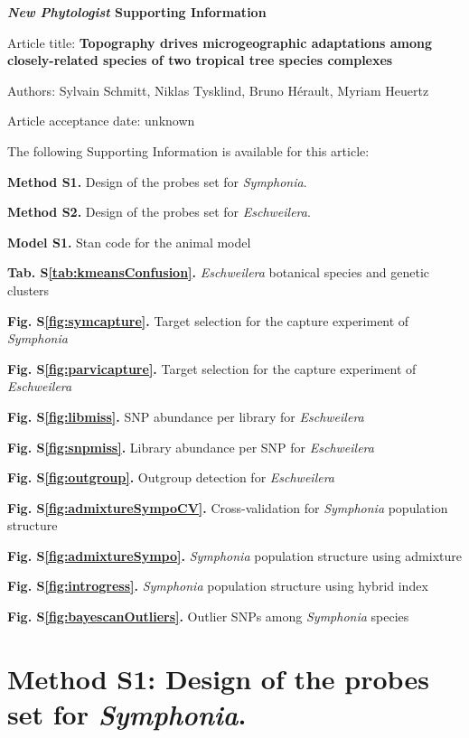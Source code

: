 \documentclass[12pt,]{article}
\begin{document}
\textbf{\emph{New Phytologist} Supporting Information}

Article title: \textbf{Topography drives microgeographic adaptations among closely-related species of two tropical tree species complexes}

Authors: Sylvain Schmitt, Niklas Tysklind, Bruno Hérault, Myriam Heuertz

Article acceptance date: unknown

The following Supporting Information is available for this article:

\textbf{Method S1.} Design of the probes set for \emph{Symphonia}.

\textbf{Method S2.} Design of the probes set for \emph{Eschweilera}.

\textbf{Model S1.} Stan code for the animal model

\textbf{Tab. S\ref{tab:kmeansConfusion}.} \emph{Eschweilera} botanical species and genetic clusters

\textbf{Fig. S\ref{fig:symcapture}.} Target selection for the capture experiment of \emph{Symphonia}

\textbf{Fig. S\ref{fig:parvicapture}.} Target selection for the capture experiment of \emph{Eschweilera}

\textbf{Fig. S\ref{fig:libmiss}.} SNP abundance per library for \emph{Eschweilera}

\textbf{Fig. S\ref{fig:snpmiss}.} Library abundance per SNP for \emph{Eschweilera}

\textbf{Fig. S\ref{fig:outgroup}.} Outgroup detection for \emph{Eschweilera}

\textbf{Fig. S\ref{fig:admixtureSympoCV}.} Cross-validation for \emph{Symphonia} population structure

\textbf{Fig. S\ref{fig:admixtureSympo}.} \emph{Symphonia} population structure using admixture

\textbf{Fig. S\ref{fig:introgress}.} \emph{Symphonia} population structure using hybrid index

\textbf{Fig. S\ref{fig:bayescanOutliers}.} Outlier SNPs among \emph{Symphonia} species

\newpage

\hypertarget{method-s1-design-of-the-probes-set-for-symphonia.}{%
\section{\texorpdfstring{Method S1: Design of the probes set for \emph{Symphonia}.}{Method S1: Design of the probes set for Symphonia.}}\label{method-s1-design-of-the-probes-set-for-symphonia.}}
\end{document}
